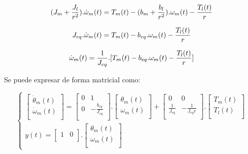 \documentclass{article}
\begin{document}
\begin{equation}
    \label{eq:4.1}
    (J_{m}+\frac{J_l}{r^2}).\dot{\omega}_{m}(t) = T_{m}(t)-(b_{m}+\frac{b_{l}}{r^2}).\omega_{m}(t)-\frac{T_{l}(t)}{r} \\
\end{equation}

\begin{equation}
    J_{eq}.\dot{\omega}_{m}(t) = T_{m}(t)-b_{eq}.\omega_{m}(t)-\frac{T_{l}(t)}{r} \\
\end{equation}

\begin{equation}
    \dot{\omega}_{m}(t) = \frac{1}{J_{eq}}.[T_{m}(t) - b_{eq}.\omega_{m}(t) - \frac{T_{l}(t)}{r}]\\
\end{equation}

Se puede expresar de forma matricial como:

\begin{equation}
\begin{cases}
    \begin{bmatrix}
        \dot{\theta}_{m}(t)\\
        \dot{\omega}_{m}(t)\\
    \end{bmatrix}
    =
    \begin{bmatrix}
        0 & 1\\
        0 & -\frac{b_{eq}}{J_{eq}}\\
    \end{bmatrix}.
    \begin{bmatrix}
        \theta_{m}(t)\\
        \omega_{m}(t)\\
    \end{bmatrix}
    +
    \begin{bmatrix}
        0 & 0\\
        \frac{1}{J_{eq}} & -\frac{1}{J_{eq}r}\\
    \end{bmatrix}.
    \begin{bmatrix}
        T_{m}(t)\\
        T_{l}(t)\\
    \end{bmatrix}\\
    y(t) = 
    \begin{bmatrix} 1 & 0\\ \end{bmatrix} .
    \begin{bmatrix} \theta_{m}(t)\\ \omega_{m}(t)\\ \end{bmatrix}
\end{cases}
\end{equation}
\end{document}

